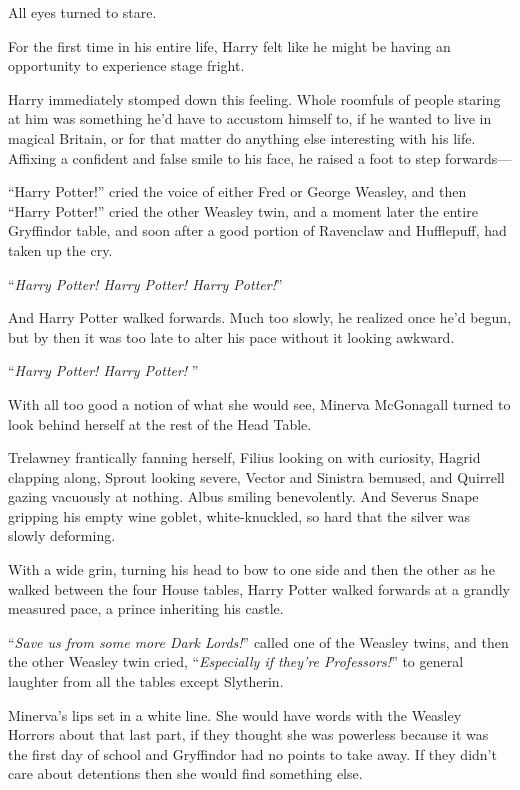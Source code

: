 All eyes turned to stare.

For the first time in his entire life, Harry felt like he might be having an opportunity to experience stage fright.

Harry immediately stomped down this feeling. Whole roomfuls of people staring at him was something he’d have to accustom himself to, if he wanted to live in magical Britain, or for that matter do anything else interesting with his life. Affixing a confident and false smile to his face, he raised a foot to step forwards—

“Harry Potter!” cried the voice of either Fred or George Weasley, and then “Harry Potter!” cried the other Weasley twin, and a moment later the entire Gryffindor table, and soon after a good portion of Ravenclaw and Hufflepuff, had taken up the cry.

“\emph{Harry Potter! Harry Potter! Harry Potter!}”

And Harry Potter walked forwards. Much too slowly, he realized once he’d begun, but by then it was too late to alter his pace without it looking awkward.

\later

“\emph{Harry Potter! Harry Potter! }”

With all too good a notion of what she would see, Minerva McGonagall turned to look behind herself at the rest of the Head Table.

Trelawney frantically fanning herself, Filius looking on with curiosity, Hagrid clapping along, Sprout looking severe, Vector and Sinistra bemused, and Quirrell gazing vacuously at nothing. Albus smiling benevolently. And Severus Snape gripping his empty wine goblet, white-knuckled, so hard that the silver was slowly deforming.

With a wide grin, turning his head to bow to one side and then the other as he walked between the four House tables, Harry Potter walked forwards at a grandly measured pace, a prince inheriting his castle.

“\emph{Save us from some more Dark Lords!}” called one of the Weasley twins, and then the other Weasley twin cried, “\emph{Especially if they’re Professors!}” to general laughter from all the tables except Slytherin.

Minerva’s lips set in a white line. She would have words with the Weasley Horrors about that last part, if they thought she was powerless because it was the first day of school and Gryffindor had no points to take away. If they didn’t care about detentions then she would find something else.

